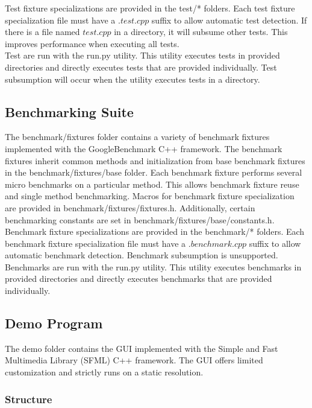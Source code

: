 \documentclass{article}
\begin{document}
\noindent
Test fixture specializations are provided in the test/* folders. Each test fixture specialization file must have a $.test.cpp$ suffix to allow  automatic test detection. If there is a file named $test.cpp$ in a directory, it will subsume other tests. This improves performance when executing all tests.
\\

\noindent
Test are run with the run.py utility. This utility executes tests in provided directories and directly executes tests that are provided individually. Test subsumption will occur when the utility executes tests in a directory.
\\

\subsection{Benchmarking Suite}
The benchmark/fixtures folder contains a variety of benchmark fixtures implemented with the GoogleBenchmark C++ framework. The benchmark fixtures inherit common methods and initialization from base benchmark fixtures in the benchmark/fixtures/base folder. Each benchmark fixture performs several micro benchmarks on a particular method. This allows benchmark fixture reuse and single method benchmarking. Macros for benchmark fixture specialization are provided in benchmark/fixtures/fixtures.h. Additionally, certain benchmarking constants are set in benchmark/fixtures/base/constants.h.
\\

\noindent
Benchmark fixture specializations are provided in the benchmark/* folders. Each benchmark fixture specialization file must have a $.benchmark.cpp$ suffix to allow automatic benchmark detection. Benchmark subsumption is unsupported.
\\

\noindent
Benchmarks are run with the run.py utility. This utility executes benchmarks in provided directories and directly executes benchmarks that are provided individually.

\subsection{Demo Program}

\noindent
The demo folder contains the GUI implemented with the Simple and Fast Multimedia Library (SFML) C++ framework. The GUI offers limited customization and strictly runs on a static resolution.

\subsubsection{Structure}
\end{document}
